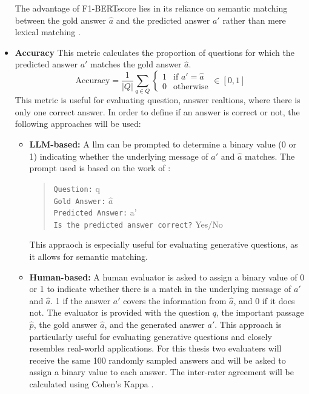 \begin{itemize}
    The advantage of F1-BERTscore lies in its reliance on semantic matching between the gold answer $\hat{a}$ and the predicted answer $a'$ rather than mere lexical matching \cite{zhang_bertscore_2020}.
    

    \item \textbf{Accuracy} This metric calculates the proportion of questions for which the predicted answer $a'$ matches the gold answer $\hat{a}$. 
    \begin{equation}
        \text{Accuracy} = \frac{1}{|Q|} \sum_{q \in Q} 
        \begin{cases}
            1 & \text{if } a' = \hat{a} \\
            0 & \text{otherwise}
        \end{cases}
        \in [0,1]
    \end{equation}
    This metric is useful for evaluating question, answer realtions, where there is only one correct answer. In order to define if an answer is correct or not, the following approaches will be used:
    \begin{itemize}
        \item \textbf{LLM-based:} A \gls{llm} can be prompted to determine a binary value (0 or 1) indicating whether the underlying message of $a'$ and $\hat{a}$ matches. The prompt used is based on the work of \cite{kamalloo_evaluating_2023}:
        \begin{quote}
            \texttt{Question:} q \\
            \texttt{Gold Answer:} $\hat{a}$ \\
            \texttt{Predicted Answer:} a' \\
            \texttt{Is the predicted answer correct?} Yes/No
        \end{quote}
        This appraoch is especially useful for evaluating generative questions, as it allows for semantic matching.
        \item \textbf{Human-based:} A human evaluator is asked to assign a binary value of 0 or 1 to indicate whether there is a match in the underlying message of $a'$ and $\hat{a}$. 1 if the answer $a'$ covers the information from $\hat{a}$, and 0 if it does not. The evaluator is provided with the question $q$, the important passage $\hat{p}$, the gold answer $\hat{a}$, and the generated answer $a'$. This approach is particularly useful for evaluating generative questions and closely resembles real-world applications. For this thesis two evaluaters will receive the same 100 randomly sampled answers and will be asked to assign a binary value to each answer. The inter-rater agreement will be calculated using Cohen's Kappa \cite{cohen_coefficient_1960}. 
    \end{itemize}
\end{itemize}
    
